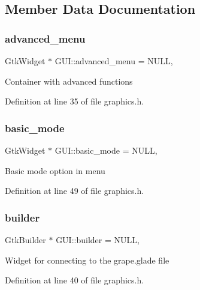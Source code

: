 \subsection{Member Data Documentation}
\mbox{\label{class_g_u_i_ac5c18505875e1951276cb6cbf6b8b53d}} 
\subsubsection{\texorpdfstring{advanced\_menu}{advanced\_menu}}
{\footnotesize\ttfamily Gtk\+Widget $\ast$ G\+U\+I\+::advanced\+\_\+menu = N\+U\+LL\hspace{0.3cm}{\ttfamily [static]}, {\ttfamily [protected]}}

Container with advanced functions 

Definition at line 35 of file graphics.\+h.

\mbox{\label{class_g_u_i_a846712dc55efc3b44efe70cad65e4f8a}} 
\subsubsection{\texorpdfstring{basic\_mode}{basic\_mode}}
{\footnotesize\ttfamily Gtk\+Widget $\ast$ G\+U\+I\+::basic\+\_\+mode = N\+U\+LL\hspace{0.3cm}{\ttfamily [static]}, {\ttfamily [protected]}}

Basic mode option in menu 

Definition at line 49 of file graphics.\+h.

\mbox{\label{class_g_u_i_aaf698841371f1491d0bba4257187c7b1}} 
\subsubsection{\texorpdfstring{builder}{builder}}
{\footnotesize\ttfamily Gtk\+Builder $\ast$ G\+U\+I\+::builder = N\+U\+LL\hspace{0.3cm}{\ttfamily [static]}, {\ttfamily [protected]}}

Widget for connecting to the grape.\+glade file 

Definition at line 40 of file graphics.\+h.

